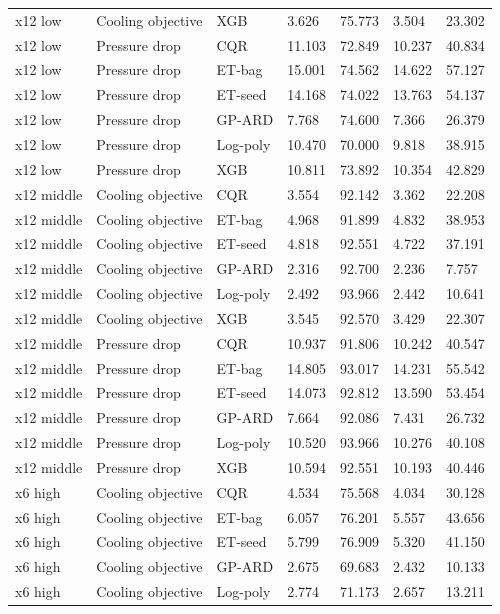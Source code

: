 \begin{longtable}{lllllll}
x12 low & Cooling objective & XGB & 3.626 & 75.773 & 3.504 & 23.302\\
x12 low & Pressure drop & CQR & 11.103 & 72.849 & 10.237 & 40.834\\
x12 low & Pressure drop & ET-bag & 15.001 & 74.562 & 14.622 & 57.127\\
x12 low & Pressure drop & ET-seed & 14.168 & 74.022 & 13.763 & 54.137\\
x12 low & Pressure drop & GP-ARD & 7.768 & 74.600 & 7.366 & 26.379\\
x12 low & Pressure drop & Log-poly & 10.470 & 70.000 & 9.818 & 38.915\\
x12 low & Pressure drop & XGB & 10.811 & 73.892 & 10.354 & 42.829\\
x12 middle & Cooling objective & CQR & 3.554 & 92.142 & 3.362 & 22.208\\
x12 middle & Cooling objective & ET-bag & 4.968 & 91.899 & 4.832 & 38.953\\
x12 middle & Cooling objective & ET-seed & 4.818 & 92.551 & 4.722 & 37.191\\
x12 middle & Cooling objective & GP-ARD & 2.316 & 92.700 & 2.236 & 7.757\\
x12 middle & Cooling objective & Log-poly & 2.492 & 93.966 & 2.442 & 10.641\\
x12 middle & Cooling objective & XGB & 3.545 & 92.570 & 3.429 & 22.307\\
x12 middle & Pressure drop & CQR & 10.937 & 91.806 & 10.242 & 40.547\\
x12 middle & Pressure drop & ET-bag & 14.805 & 93.017 & 14.231 & 55.542\\
x12 middle & Pressure drop & ET-seed & 14.073 & 92.812 & 13.590 & 53.454\\
x12 middle & Pressure drop & GP-ARD & 7.664 & 92.086 & 7.431 & 26.732\\
x12 middle & Pressure drop & Log-poly & 10.520 & 93.966 & 10.276 & 40.108\\
x12 middle & Pressure drop & XGB & 10.594 & 92.551 & 10.193 & 40.446\\
x6 high & Cooling objective & CQR & 4.534 & 75.568 & 4.034 & 30.128\\
x6 high & Cooling objective & ET-bag & 6.057 & 76.201 & 5.557 & 43.656\\
x6 high & Cooling objective & ET-seed & 5.799 & 76.909 & 5.320 & 41.150\\
x6 high & Cooling objective & GP-ARD & 2.675 & 69.683 & 2.432 & 10.133\\
x6 high & Cooling objective & Log-poly & 2.774 & 71.173 & 2.657 & 13.211\\

\end{longtable}
